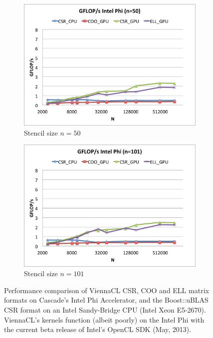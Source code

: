 \documentclass{report}
\begin{document}
\begin{figure}
\begin{subfigure}[t]{0.48\textwidth}
\includegraphics[width=\textwidth]{gpu_content/cascade_spmv/gflops_cascade_intel_phi_n50.png}
\caption{Stencil size $n=50$}
\end{subfigure}
\quad
\begin{subfigure}[t]{0.48\textwidth}
\centering
\includegraphics[width=\textwidth]{gpu_content/cascade_spmv/gflops_cascade_intel_phi_n101.png}
\caption{Stencil size $n=101$}
\end{subfigure}
\caption{Performance comparison of ViennaCL CSR, COO and ELL matrix formats on Cascade's Intel Phi Accelerator, and the Boost::uBLAS CSR format on an Intel Sandy-Bridge CPU (Intel Xeon E5-2670). ViennaCL's kernels function (albeit poorly) on the Intel Phi with the current beta release of Intel's OpenCL SDK (May, 2013). }
\label{fig:gflops_cascade_intel_phi}
\end{figure}
\end{document}

